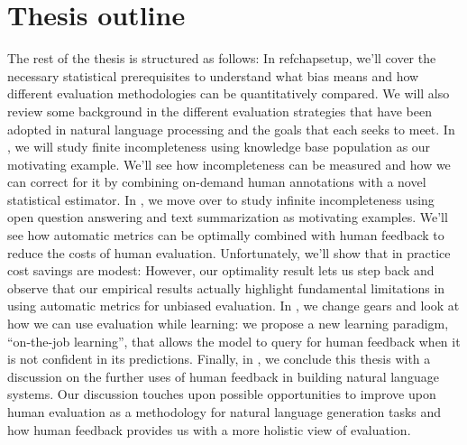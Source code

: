 \section{Thesis outline}
The rest of the thesis is structured as follows:
In refchap{setup}, we'll cover the necessary statistical prerequisites to understand what bias means and how different evaluation methodologies can be quantitatively compared.
We will also review some background in the different evaluation strategies that have been adopted in natural language processing and the goals that each seeks to meet.
In , we will study finite incompleteness using knowledge base population as our motivating example.
We'll see how incompleteness can be measured and how we can correct for it by combining on-demand human annotations with a novel statistical estimator.
In , we move over to study infinite incompleteness using open question answering and text summarization as motivating examples.
We'll see how automatic metrics can be optimally combined with human feedback to reduce the costs of human evaluation.
Unfortunately, we'll show that in practice cost savings are modest: 
However, our optimality result lets us step back and observe that our empirical results actually highlight fundamental limitations in using automatic metrics for unbiased evaluation. 
In , we change gears and look at how we can use evaluation while learning: we propose a new learning paradigm, ``on-the-job learning'', that allows the model to query for human feedback when it is not confident in its predictions.
Finally, in , we conclude this thesis with a discussion on the further uses of human feedback in building natural language systems.
Our discussion touches upon possible opportunities to improve upon human evaluation as a methodology for natural language generation tasks and how human feedback provides us with a more holistic view of evaluation.
